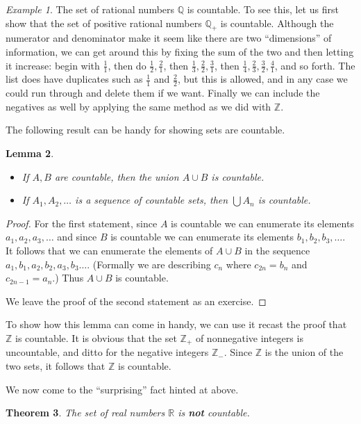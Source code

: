 \documentclass[11pt,oneside]{amsbook}
\newcommand{\Z}{\mathbb Z}
\newcommand{\Q}{\mathbb Q}
\newcommand{\R}{\mathbb R}
\theoremstyle{definition}
\theoremstyle{plain}
\newtheorem{theorem}{Theorem}[section]
\newtheorem{lemma}[theorem]{Lemma}
\theoremstyle{definition}
\theoremstyle{remark}
\newtheorem{example}[theorem]{Example}
\numberwithin{equation}{section}
\numberwithin{figure}{section}
\begin{document}
\begin{example}
  The set of rational numbers $\Q$ is countable. To see this, let us first show that the set of positive rational numbers $\Q_+$ is countable. Although the numerator and denominator make it seem like there are two ``dimensions'' of information, we can get around this by fixing the sum of the two and then letting it increase: begin with $\frac11$, then do $\frac12,\frac21$, then $\frac13,\frac22,\frac31$, then $\frac14,\frac23,\frac32,\frac41$, and so forth. The list does have duplicates such as $\frac11$ and $\frac22$, but this is allowed, and in any case we could run through and delete them if we want. Finally we can include the negatives as well by applying the same method as we did with $\Z$.
\end{example}

The following result can be handy for showing sets are countable.

\begin{lemma}
  \begin{itemize}
  \item If $A,B$ are countable, then the union $A\cup B$ is countable.
  \item If $A_1,A_2,\ldots$ is a sequence of countable sets, then $\bigcup A_n$ is countable.
  \end{itemize}
\end{lemma}

\begin{proof}
  For the first statement, since $A$ is countable we can enumerate its elements $a_1,a_2,a_3,\ldots$ and since $B$ is countable we can enumerate its elements $b_1,b_2,b_3,\ldots$. It follows that we can enumerate the elements of $A\cup B$ in the sequence $a_1,b_1,a_2,b_2,a_3,b_3\ldots$. (Formally we are describing $c_n$ where $c_{2n}=b_n$ and $c_{2n-1}=a_n$.) Thus $A\cup B$ is countable.

  We leave the proof of the second statement as an exercise.
\end{proof}

To show how this lemma can come in handy, we can use it recast the proof that $\Z$ is countable. It is obvious that the set $\Z_+$ of nonnegative integers is uncountable, and ditto for the negative integers $\Z_-$. Since $\Z$ is the union of the two sets, it follows that $\Z$ is countable.

We now come to the ``surprising'' fact hinted at above.

\begin{theorem}
  \label{thm:reals-uncountable}
  The set of real numbers $\R$ is \textbf{not} countable.
\end{theorem}
\end{document}
